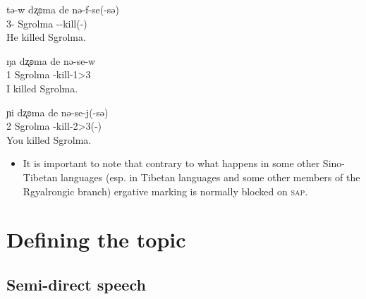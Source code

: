 \documentclass[oneside,a4paper,11pt]{article}
\newcommand{\ipa}[1]{{\phon #1}} %
\newcommand{\ipapl}[1]{{\phondroit #1}}
\begin{document}
\begin{exe}
\ex \label{ex:33}
\gll
	\ipa{tə-w} \ipapl{dʐʚma} \ipapl{de} \ipapl{nə-f-se(-sə)} \\
	{3\sg-\erg} Sgrolma {\dem} {\prf-\inv-kill(-\evid)}\\ 
	\glt He killed Sgrolma.
\end{exe}

\begin{exe}
\ex \label{ex:13}
\gll
	\ipa{ŋa}	\ipapl{dʐʚma} 	\ipapl{de} 	\ipapl{nə-se-w} \\
	{1\sg} Sgrolma {\dem} {\prf-kill-1\sg>3}\\ 
	\glt I killed Sgrolma.
\end{exe}

\begin{exe}
\ex \label{ex:23}
\gll
	\ipa{ɲi}	\ipapl{dʐʚma} 	\ipapl{de} 	\ipapl{nə-se-j(-sə)} \\
	{2\sg} Sgrolma {\dem} {\prf-kill-2\sg>3(-\evid)}\\ 
	\glt You killed Sgrolma.
\end{exe}




 
\begin{itemize}
 \item It is important to note that contrary to what happens in some other Sino-Tibetan languages (esp. in Tibetan languages and some other members of the Rgyalrongic branch) ergative marking is normally blocked on \textsc{sap}.%
\end{itemize}



\section{Defining the topic}

\subsection{Semi-direct speech}
\end{document}

